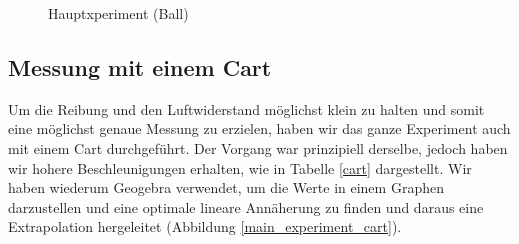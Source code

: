 \documentclass[a4paper, titlepage]{article}
\begin{document}
    \begin{figure}
        \centering
        \qquad
        \caption{Hauptxperiment (Ball)}
        \label{main_experiment_ball}
    \end{figure}

    
    \subsection{Messung mit einem Cart}
    Um die Reibung und den Luftwiderstand möglichst 
    klein zu halten und somit eine möglichst genaue
    Messung zu erzielen, haben wir das ganze Experiment
    auch mit einem Cart durchgeführt. Der Vorgang war
    prinzipiell derselbe, jedoch haben wir hohere
    Beschleunigungen erhalten, wie in Tabelle \ref{cart}
    dargestellt. Wir haben wiederum Geogebra verwendet,
    um die Werte in einem Graphen darzustellen und eine
    optimale lineare Annäherung zu finden
    und daraus eine Extrapolation hergeleitet 
    (Abbildung \ref{main_experiment_cart}).
    
    
    
\end{document}
